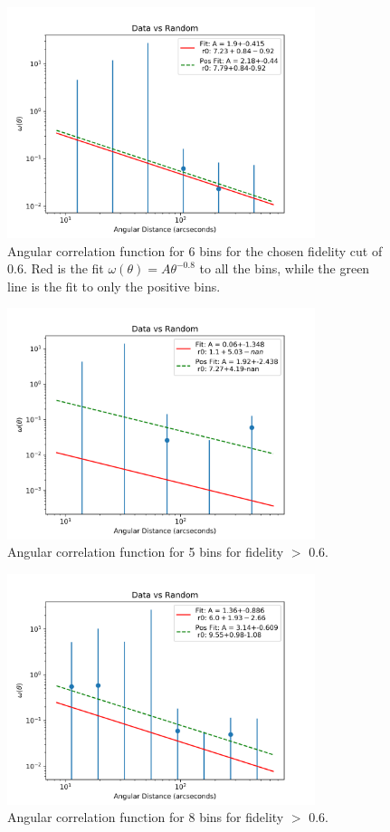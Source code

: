 \begin{figure}[!tbp]
\centering \includegraphics[width=90mm]{clustering/Data_vs_Random_10000_bin6_sn0_6_NFalse.png}
\caption{Angular correlation function for 6 bins for the chosen fidelity cut of 0.6. Red is the fit $\omega(\theta) = A\theta^{-0.8}$ to all the bins, while the green line is the fit to only the positive bins. }
\label{fig:Angular_binnings}
\end{figure}

\begin{figure}[!tbp]
\centering \includegraphics[width=90mm]{clustering/Data_vs_Random_10000_bin5_sn0_6_NFalse.png}
\caption{Angular correlation function for 5 bins  for fidelity $>$ 0.6.}
\label{fig:Angular_bin_5}
\end{figure}

\begin{figure}[!tbp]
\centering \includegraphics[width=90mm]{clustering/Data_vs_Random_10000_bin8_sn0_6_NFalse.png}
\caption{Angular correlation function for 8 bins for fidelity $>$ 0.6.}
\label{fig:Angular_bin_8}
\end{figure}

